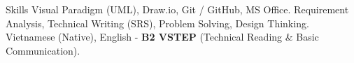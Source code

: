 \begin{rubric}{Skills}
\entry*[Tools]
    Visual Paradigm (UML), Draw.io, Git / GitHub, MS Office.
    Requirement Analysis, Technical Writing (SRS), Problem Solving, Design Thinking.
\entry*[Languages]
    Vietnamese (Native), English - \textbf{B2 VSTEP} (Technical Reading \& Basic Communication).
\end{rubric}
